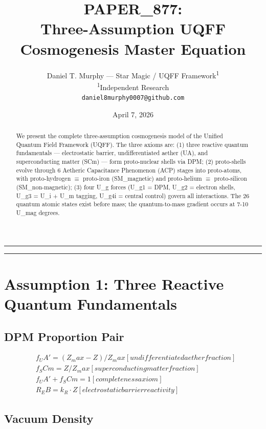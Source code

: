 \documentclass[12pt,a4paper]{article}
\title{\textbf{PAPER\_877: \\ Three-Assumption UQFF Cosmogenesis Master Equation}}
\author{
Daniel T. Murphy --- Star Magic / UQFF Framework\textsuperscript{1} \\
\small \textsuperscript{1}Independent Research \\
\small \texttt{daniel8murphy0007@github.com}
}
\date{April 7, 2026}
\begin{document}
\maketitle

\medskip\hrule\medskip

\begin{abstract}
We present the complete three-assumption cosmogenesis model of the Unified Quantum Field Framework (UQFF). The three axioms are: (1) three reactive quantum fundamentals --- electrostatic barrier, undifferentiated aether (UA), and superconducting matter (SCm) --- form proto-nuclear shells via DPM; (2) proto-shells evolve through 6 Aetheric Capacitance Phenomenon (ACP) stages into proto-atoms, with proto-hydrogen $\equiv$ proto-iron (SM\_magnetic) and proto-helium $\equiv$ proto-silicon (SM\_non-magnetic); (3) four U\_g forces (U\_g1 = DPM, U\_g2 = electron shells, U\_g3 = U\_i + U\_m tagging, U\_g4i = central control) govern all interactions. The 26 quantum atomic states exist before mass; the quantum-to-mass gradient occurs at 7-10 U\_mag degrees.
\end{abstract}

\medskip\hrule\medskip

\section{Assumption 1: Three Reactive Quantum Fundamentals}

\subsection{DPM Proportion Pair}

\begin{equation}
\begin{aligned}
  & f_UA' = (Z_max - Z) / Z_max     [undifferentiated aether fraction] \\
  & f_SCm = Z / Z_max                [superconducting matter fraction] \\
  & f_UA' + f_SCm = 1                [completeness axiom] \\
  & R_EB = k_R \cdot Z                   [electrostatic barrier reactivity]
\end{aligned}
\end{equation}

\subsection{Vacuum Density}
\end{document}
